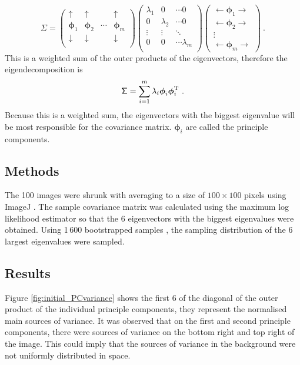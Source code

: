 \documentclass[12pt]{report}
\newcommand{\T}{^\textup{T}}
\newcommand{\vectGreek}[1]{\boldsymbol{#1}}
\newcommand{\matr}[1]{\mathsf{#1}}
\begin{document}
\begin{equation*}
\matr{\Sigma}
=
\begin{pmatrix}
		\uparrow & \uparrow & & \uparrow \\
		\vectGreek{\phi}_1 & \vectGreek{\phi}_2 &\cdots& \vectGreek{\phi}_m \\
		\downarrow & \downarrow & & \downarrow \\
\end{pmatrix}
\begin{pmatrix}
	\lambda_1 & 0 & \cdots 0 \\
	0 & \lambda_2 & \cdots 0 \\
	\vdots & \vdots & \ddots \\
	0 & 0 & \cdots \lambda_m \\
\end{pmatrix}
\begin{pmatrix}
	\leftarrow\vectGreek{\phi}_1\rightarrow \\
	\leftarrow\vectGreek{\phi}_2\rightarrow \\
	\vdots \\
	\leftarrow\vectGreek{\phi}_m\rightarrow
\end{pmatrix} \ .
\end{equation*}
This is a weighted sum of the outer products of the eigenvectors, therefore the eigendecomposition is
\begin{equation}
\matr{\Sigma} = \sum_{i=1}^{m} \lambda_i \vectGreek{\phi}_i \vectGreek{\phi}_i\T \ .
\end{equation}
Because this is a weighted sum, the eigenvectors with the biggest eigenvalue will be most responsible for the covariance matrix. $\vectGreek{\phi}_i$ are called the principle components.

\subsection{Methods}
The 100 images were shrunk with averaging to a size of $100\times100$ pixels using ImageJ \cite{schindelin2012fiji}. The sample covariance matrix was calculated using the maximum log likelihood estimator so that the 6 eigenvectors with the biggest eigenvalues were obtained. Using 1\,600 bootstrapped samples \cite{efron1992bootstrap}, the sampling distribution of the 6 largest eigenvalues were sampled.

\subsection{Results}
Figure \ref{fig:initial_PCvariance} shows the first 6 of the diagonal of the outer product of the individual principle components, they represent the normalised main sources of variance. It was observed that on the first and second principle components, there were sources of variance on the bottom right and top right of the image. This could imply that the sources of variance in the background were not uniformly distributed in space.
\end{document}
